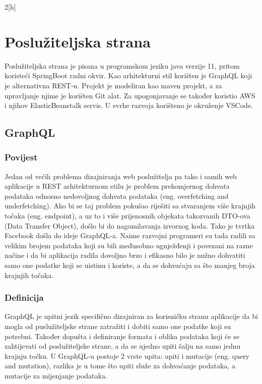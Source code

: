 \documentclass[times, utf8, zavrsni]{fer}
\begin{document}
\begin{multicols}{2}[h]
      
      \label{lst:SQL kod}
\end{multicols}

\chapter{Poslužiteljska strana}
Poslužiteljska strana je pisana u programskom jeziku java verzije 11, pritom koristeći
SpringBoot radni okvir. Kao arhitekturni stil korišten je GraphQL koji je alternativna REST-u.
Projekt je modeliran kao maven projekt, a za upravljanje njime je korišten Git alat. Za upogonjavanje
se također koristio AWS i njihov ElasticBeanstalk servis. U svrhe razvoja korišteno je okruženje VSCode.

\section{GraphQL}

\subsection{Povijest}
Jedan od većih problema dizajniranja web poslužitelja pa tako i samih web aplikacije u REST
arhitekturnom stilu je problem prekomjernog dohvata podataka odnosno nedovoljnog dohvata podataka
(eng. overfetching and underfetching). Ako bi se taj problem pokušao riješiti sa
stvaranjem više krajnjih točaka (eng. endpoint), a uz to i više prijenosnih objekata takozvanih DTO-ova
(Data Transfer Object), došlo bi do nagomilavanja izvornog koda. Tako je tvrtka Facebook došla
do ideje GraphQL-a. Naime razvojni programeri su tada radili sa velikim brojem podataka koji su
bili međusobno ugnježđenji i povezani na razne načine i da bi aplikacija radila dovoljno brzo
i efikasno bilo je nužno dohvatiti samo one podatke koji se uistinu i koriste, a da se dohvaćaju sa
što manjeg broja krajnjih točaka.

\subsection{Definicija}
GraphQL je upitni jezik specifično dizajniran za korisničku stranu aplikacije da bi mogla
od puslužiteljske strane zatražiti i dobiti samo one podatke koji su potrebni. Također
dopušta i definiranje formata i oblika podataka koji će se zahtijevati od poslužiteljske strane, a
da se ujedno upiti šalju na samo jednu krajnju točku. U GraphQL-u postoje 2 vrste upita:
upiti i mutacije (eng. query and mutation), razlika je u tome što upiti služe za dohvaćanje podataka,
a mutacije za mijenjanje podataka.
\end{document}
